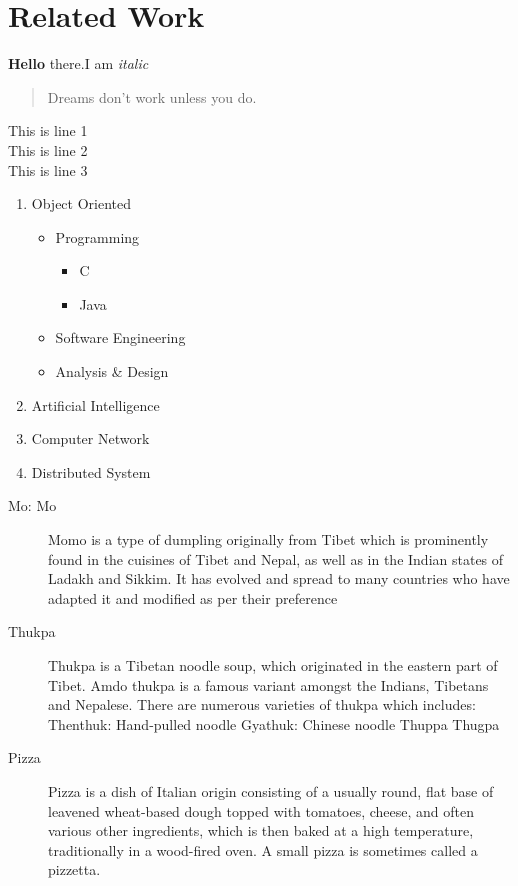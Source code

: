 \documentclass [12pt]{report}
\begin{document}
\section{Related Work}
\textbf{Hello} there.I am \textit{italic}
\begin{quote}
    Dreams don't work unless you do.
\end{quote}
\begin{center}
    This is line 1\\
    This is line 2\\
    This is line 3\\
\end{center}
\begin{enumerate}
    \item Object Oriented
    \begin{itemize}
        \item Programming
        \begin{itemize}
            \item C
            \item Java
        \end{itemize}
        \item Software Engineering
        \item Analysis \& Design
    \end{itemize}
    \item Artificial Intelligence
    \item Computer Network
    \item Distributed System
\end{enumerate}
\begin{description}
\item[Mo: Mo]{Momo is a type of dumpling originally from Tibet which is prominently found in the cuisines of Tibet and Nepal, as well as in the Indian states of Ladakh and Sikkim. It has evolved and spread to many countries who have adapted it and modified as per their preference}
\item[Thukpa]{Thukpa is a Tibetan noodle soup, which originated in the eastern part of Tibet. Amdo thukpa is a famous variant amongst the Indians, Tibetans and Nepalese. There are numerous varieties of thukpa which includes: Thenthuk: Hand-pulled noodle Gyathuk: Chinese noodle Thuppa Thugpa}
\item[Pizza]{Pizza is a dish of Italian origin consisting of a usually round, flat base of leavened wheat-based dough topped with tomatoes, cheese, and often various other ingredients, which is then baked at a high temperature, traditionally in a wood-fired oven. A small pizza is sometimes called a pizzetta.}
\end{description}
\end{document}
